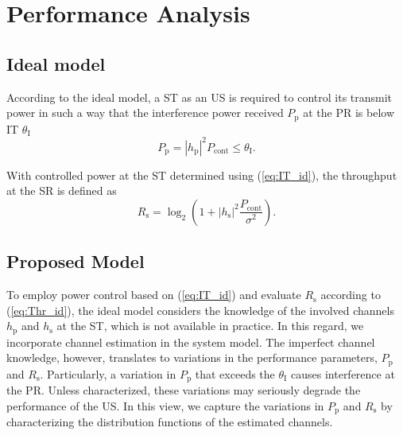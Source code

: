\documentclass[12pt, draftclsnofoot, onecolumn]{IEEEtran}
\newcommand{\e}[2]{{\mathbb E}_{#1}\left[ #2 \right]}
\newcommand{\sub}[1]{_{\text{#1}}}
\newcommand{\preg}{P\sub{cont}}
\newcommand{\pp}{P\sub{p}}
\newcommand{\ite}{\theta\sub{I}}
\newcommand{\rs}{R\sub{s}}
\newcommand{\trs}{R\sub{s}}
\newcommand{\gp}{h\sub{p}}
\newcommand{\gs}{h\sub{s}}
\newcommand{\pgp}{|h\sub{p}|^2}
\newcommand{\pgs}{|h\sub{s}|^2}
\newcommand{\nps}{\sigma^2}
\begin{document}

  
\section{Performance Analysis} \label{sec:et_ana}
\subsection{Ideal model}
According to the ideal model, a ST as an US is required to control its transmit power in such a way that the interference power received $\pp$ at the PR is below IT $\ite$ \cite{Xing07}
\begin{equation}
\pp = \pgp \preg \le \ite.
\label{eq:IT_id}
\end{equation}

With controlled power at the ST determined using (\ref{eq:IT_id}), the throughput at the SR is defined as
\begin{equation}
\rs = \log_2 \left(1 + \pgs \frac{\preg}{ \nps} \right). 
\label{eq:Thr_id}
\end{equation}
\subsection{Proposed Model} 
To employ power control based on (\ref{eq:IT_id}) and evaluate $\rs$ according to (\ref{eq:Thr_id}), the ideal model considers the knowledge of the involved channels $\gp$ and $\gs$ at the ST, which is not available in practice. In this regard, we incorporate channel estimation in the system model. The imperfect channel knowledge, however, translates to variations in the performance parameters, $\pp$ and $\trs$. Particularly, a variation in $\pp$ that exceeds the $\ite$ causes interference at the PR. Unless characterized, these variations may seriously degrade the performance of the US. In this view, we capture the variations in $\pp$ and $\trs$ by characterizing the distribution functions of the estimated channels.
\end{document}

